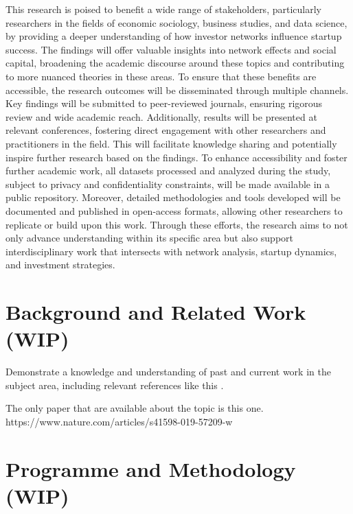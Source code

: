 \documentclass[a4paper,11pt]{article}
\begin{document}
This research is poised to benefit a wide range of stakeholders, particularly researchers in the fields of economic sociology, business studies, and data science, by providing a deeper understanding of how investor networks influence startup success. The findings will offer valuable insights into network effects and social capital, broadening the academic discourse around these topics and contributing to more nuanced theories in these areas. To ensure that these benefits are accessible, the research outcomes will be disseminated through multiple channels. Key findings will be submitted to peer-reviewed journals, ensuring rigorous review and wide academic reach. Additionally, results will be presented at relevant conferences, fostering direct engagement with other researchers and practitioners in the field. This will facilitate knowledge sharing and potentially inspire further research based on the findings. To enhance accessibility and foster further academic work, all datasets processed and analyzed during the study, subject to privacy and confidentiality constraints, will be made available in a public repository. Moreover, detailed methodologies and tools developed will be documented and published in open-access formats, allowing other researchers to replicate or build upon this work. Through these efforts, the research aims to not only advance understanding within its specific area but also support interdisciplinary work that intersects with network analysis, startup dynamics, and investment strategies.

\section{Background and Related Work (WIP)}

Demonstrate a knowledge and understanding of past and current work in the subject area, including relevant references like this \cite{template}.

The only paper that are available about the topic is this one. https://www.nature.com/articles/s41598-019-57209-w


\section{Programme and Methodology (WIP)}
\end{document}
